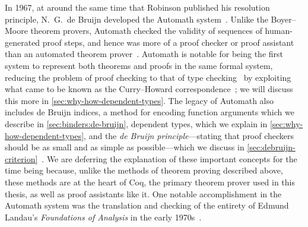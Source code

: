 In 1967, at around the same time that Robinson published his resolution principle, N.~G.~de Bruijn developed the Automath system~\cite{Automath2002Kamareddine,Survey1994deBruijn,mathematical1970Bruijn,wiki:AutoMath}.
Unlike the Boyer--Moore theorem provers, Automath checked the validity of sequences of human-generated proof steps, and hence was more of a proof checker or proof assistant than an automated theorem prover~\cite{ringer2020qed}.
Automath is notable for being the first system to represent both theorems and proofs in the same formal system, reducing the problem of proof checking to that of type checking~\cite{ringer2020qed} by exploiting what came to be known as the Curry--Howard correspondence~\cite{Automath2002Kamareddine}; we will discuss this more in \autoref{sec:why-how-dependent-types}.
The legacy of Automath also includes de Bruijn indices, a method for encoding function arguments which we describe in \autoref{sec:binders:de-bruijn}, dependent types, which we explain in \autoref{sec:why-how-dependent-types}, and the \emph{de Bruijn principle}---stating that proof checkers should be as small and as simple as possible---which we discuss in \autoref{sec:debruijn-criterion}~\cite{ringer2020qed,Automath2002Kamareddine}.
We are deferring the explanation of these important concepts for the time being because, unlike the methods of theorem proving described above, these methods are at the heart of Coq, the primary theorem prover used in this thesis, as well as proof assistants like it.
One notable accomplishment in the Automath system was the translation and checking of the entirety of Edmund Landau's \emph{Foundations of Analysis} in the early 1970s~\cite{Automath2002Kamareddine}.

